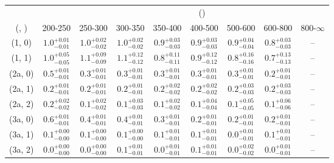 \begin{table}[h!]
\tiny
\centering
{}
\begin{tabular}
{ccccccccc}
	\hline\hline
&	& \multicolumn{8}{c}{\scalht (\gev)} \\ 
	 (\njet,  \nb) & 200-250 & 250-300 & 300-350 & 350-400 & 400-500 & 500-600 & 600-800 & 800-$\infty$ \\ [0.8ex] 
\hline
	(1, 0) & $1.0^{+ 0.01 }_{- 0.01 }$ & $1.0^{+ 0.02 }_{- 0.02 }$ & $1.0^{+ 0.02 }_{- 0.02 }$ & $0.9^{+ 0.03 }_{- 0.03 }$ & $0.9^{+ 0.03 }_{- 0.03 }$ & $0.9^{+ 0.04 }_{- 0.04 }$ & $0.8^{+ 0.03 }_{- 0.03 }$ & -- \\[0.5ex] 
	(1, 1) & $1.0^{+ 0.05 }_{- 0.05 }$ & $1.1^{+ 0.09 }_{- 0.09 }$ & $1.1^{+ 0.12 }_{- 0.12 }$ & $0.8^{+ 0.11 }_{- 0.11 }$ & $0.9^{+ 0.12 }_{- 0.12 }$ & $0.8^{+ 0.16 }_{- 0.16 }$ & $0.7^{+ 0.13 }_{- 0.13 }$ & -- \\[0.5ex] 
	(2a, 0) & $0.5^{+ 0.01 }_{- 0.01 }$ & $0.3^{+ 0.01 }_{- 0.01 }$ & $0.3^{+ 0.01 }_{- 0.01 }$ & $0.3^{+ 0.01 }_{- 0.01 }$ & $0.3^{+ 0.01 }_{- 0.01 }$ & $0.3^{+ 0.01 }_{- 0.01 }$ & $0.2^{+ 0.01 }_{- 0.01 }$ & -- \\[0.5ex] 
	(2a, 1) & $0.2^{+ 0.01 }_{- 0.01 }$ & $0.2^{+ 0.01 }_{- 0.01 }$ & $0.2^{+ 0.01 }_{- 0.01 }$ & $0.2^{+ 0.02 }_{- 0.02 }$ & $0.2^{+ 0.02 }_{- 0.02 }$ & $0.2^{+ 0.03 }_{- 0.03 }$ & $0.2^{+ 0.03 }_{- 0.03 }$ & -- \\[0.5ex] 
	(2a, 2) & $0.2^{+ 0.02 }_{- 0.02 }$ & $0.1^{+ 0.02 }_{- 0.02 }$ & $0.1^{+ 0.03 }_{- 0.03 }$ & $0.1^{+ 0.02 }_{- 0.02 }$ & $0.1^{+ 0.04 }_{- 0.04 }$ & $0.1^{+ 0.05 }_{- 0.05 }$ & $0.1^{+ 0.06 }_{- 0.06 }$ & -- \\[0.5ex] 
	(3a, 0) & $0.6^{+ 0.01 }_{- 0.01 }$ & $0.4^{+ 0.01 }_{- 0.01 }$ & $0.4^{+ 0.01 }_{- 0.01 }$ & $0.3^{+ 0.01 }_{- 0.01 }$ & $0.2^{+ 0.01 }_{- 0.01 }$ & $0.2^{+ 0.01 }_{- 0.01 }$ & $0.2^{+ 0.01 }_{- 0.01 }$ & -- \\[0.5ex] 
	(3a, 1) & $0.1^{+ 0.00 }_{- 0.00 }$ & $0.1^{+ 0.00 }_{- 0.00 }$ & $0.1^{+ 0.00 }_{- 0.00 }$ & $0.1^{+ 0.01 }_{- 0.01 }$ & $0.1^{+ 0.01 }_{- 0.01 }$ & $0.0^{+ 0.01 }_{- 0.01 }$ & $0.1^{+ 0.01 }_{- 0.01 }$ & -- \\[0.5ex] 
	(3a, 2) & $0.0^{+ 0.00 }_{- 0.00 }$ & $0.0^{+ 0.00 }_{- 0.00 }$ & $0.1^{+ 0.01 }_{- 0.01 }$ & $0.0^{+ 0.01 }_{- 0.01 }$ & $0.1^{+ 0.01 }_{- 0.01 }$ & $0.0^{+ 0.02 }_{- 0.02 }$ & $0.0^{+ 0.01 }_{- 0.01 }$ & -- \\[0.5ex] 

\end{tabular}
\end{table}
